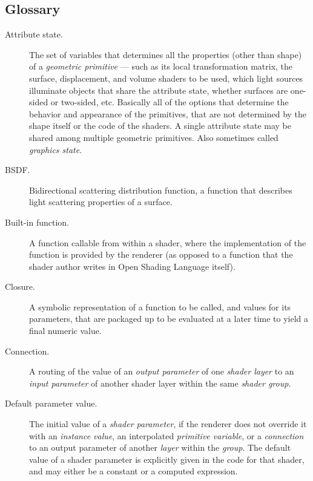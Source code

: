 \documentclass[11pt,letterpaper]{book}
\def\langname{Open Shading Language\xspace}
\begin{document}
\begin{appendix}

\chapter{Glossary}
\label{chap:glossary}

\begin{description}

\item[Attribute state.] The set of variables that determines all the
  properties (other than shape) of a \emph{geometric primitive} --- such
  as its local transformation matrix, the surface, displacement, and
  volume shaders to be used, which light sources illuminate objects that
  share the attribute state, whether surfaces are one-sided or
  two-sided, etc.  Basically all of the options that determine the
  behavior and appearance of the primitives, that are not determined by
  the shape itself or the code of the shaders.  A single attribute state
  may be shared among multiple geometric primitives.  Also sometimes
  called \emph{graphics state}.

\item[BSDF.] Bidirectional scattering distribution function, a
  function that describes light scattering properties of a surface.

\item[Built-in function.] A function callable from within a shader, where
  the implementation of the function is provided by the renderer (as
  opposed to a function that the shader author writes in \langname
  itself).

\item[Closure.] A symbolic representation of a function to be called,
  and values for its parameters, that are packaged up to be evaluated
  at a later time to yield a final numeric value.

\item[Connection.] A routing of the value of an \emph{output parameter}
  of one \emph{shader layer} to an \emph{input parameter} of another
  shader layer within the same \emph{shader group}.

\item[Default parameter value.] The initial value of a \emph{shader
  parameter}, if the renderer does not override it with an
  \emph{instance value}, an interpolated \emph{primitive variable}, or a
  \emph{connection} to an output parameter of another \emph{layer}
  within the \emph{group}.  The default value of a shader parameter
  is explicitly given in the code for that shader, and may either be
  a constant or a computed expression.


\end{description}
\end{appendix}
\end{document}
